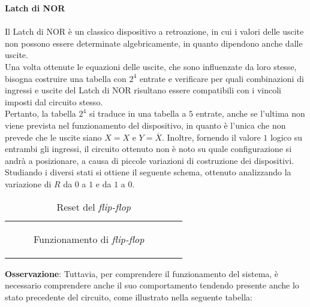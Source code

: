 \documentclass[a4paper]{extarticle}
\renewcommand\arraystretch{}
\begin{document}
\vspace{1em}
\noindent
\textbf{Latch di NOR}\\\\
Il Latch di NOR è un classico dispositivo a retroazione, in cui i valori delle uscite non possono essere determinate algebricamente, in quanto dipendono anche dalle uscite.\\
Una volta ottenute le equazioni delle uscite, che sono influenzate da loro stesse, bisogna costruire una tabella con \(2^4\) entrate e verificare per quali combinazioni di ingressi e uscite del Latch di NOR risultano essere compatibili con i vincoli imposti dal circuito stesso.\\
Pertanto, la tabella \(2^4\) si traduce in una tabella a \(5\) entrate, anche se l'ultima non viene prevista nel funzionamento del dispositivo, in quanto è l'unica che non prevede che le uscite siano \(X = X\) e \(Y = \overline{X}\). Inoltre, fornendo il valore \(1\) logico su entrambi gli ingressi, il circuito ottenuto non è noto su quale configurazione si andrà a posizionare, a causa di piccole variazioni di costruzione dei dispositivi.\\
Studiando i diversi stati si ottiene il seguente schema, ottenuto analizzando la variazione di \(R\) da \(0\) a \(1\) e da \(1\) a \(0\).

\begin{table}[H]
    \centering
    \setlength{\tabcolsep}{10pt}
    \renewcommand{\arraystretch}{1.4}
    \begin{tabularx}{\textwidth}{PP}
    {
        \begin{figure}[H]
            \centering
            \caption{Funzionamento di \textit{flip-flop}}
            \label{fig:flip-flop}
        \end{figure}
    }
    &
    {

    }
    \end{tabularx}
    \caption{Reset del \textit{flip-flop}}
    \label{tab:reset}
\end{table}

\vspace{1em}
\noindent
\textbf{Osservazione}: Tuttavia, per comprendere il funzionamento del sistema, è necessario comprendere anche il suo comportamento tendendo presente anche lo stato precedente del circuito, come illustrato nella seguente tabella:
\end{document}
